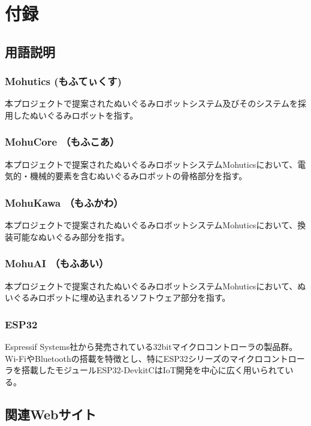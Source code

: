 \documentclass[uplatex,a4paper,12pt]{jsarticle}
\begin{document}
\section{付録}

\subsection{用語説明}
\subsubsection{Mohutics (もふてぃくす)}
本プロジェクトで提案されたぬいぐるみロボットシステム及びそのシステムを採用したぬいぐるみロボットを指す。
\subsubsection{MohuCore （もふこあ）}
本プロジェクトで提案されたぬいぐるみロボットシステムMohuticsにおいて、電気的・機械的要素を含むぬいぐるみロボットの骨格部分を指す。
\subsubsection{MohuKawa （もふかわ）}
本プロジェクトで提案されたぬいぐるみロボットシステムMohuticsにおいて、換装可能なぬいぐるみ部分を指す。
\subsubsection{MohuAI （もふあい）}
本プロジェクトで提案されたぬいぐるみロボットシステムMohuticsにおいて、ぬいぐるみロボットに埋め込まれるソフトウェア部分を指す。

\subsubsection{ESP32}
Espressif Systems社から発売されている32bitマイクロコントローラの製品群。
Wi-FiやBluetoothの搭載を特徴とし、特にESP32シリーズのマイクロコントローラを搭載したモジュールESP32-DevkitCはIoT開発を中心に広く用いられている。

\subsection{関連Webサイト}
\end{document}
